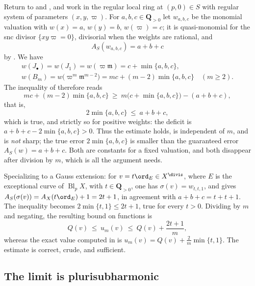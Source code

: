 \begin{example}
\label{ex:ch40-monomial-valuation}
Return to  and
, and work in the regular local ring at
$(p,0)\in S$ with regular system of parameters $(x,y,\varpi)$.  For
$a,b,c\in\mathbf Q_{>0}$ let $w_{a,b,c}$ be the monomial valuation with
$w(x)=a$, $w(y)=b$, $w(\varpi)=c$; it is quasi-monomial for the snc
divisor $\{xy\varpi=0\}$, divisorial when the weights are rational, and
\[
 A_S(w_{a,b,c})=a+b+c
\]
by .  We have
\[
 \begin{gathered}
 w(J_\bullet)=w(J_1)=w(\varpi\mathfrak m)=c+\min\{a,b,c\},\\
 w(B_m)=w\bigl(\varpi^m\mathfrak m^{m-2}\bigr)=mc+(m-2)\min\{a,b,c\}
 \quad(m\ge2).
 \end{gathered}
\]
The inequality of  therefore reads
\[
 mc+(m-2)\min\{a,b,c\}
 \ \ge\ m\bigl(c+\min\{a,b,c\}\bigr)-(a+b+c),
\]
that is,
\[
 2\min\{a,b,c\}\ \le\ a+b+c,
\]
which is true, and strictly so for positive weights: the deficit is
$a+b+c-2\min\{a,b,c\}>0$.  Thus the estimate holds, is independent of
$m$, and is \emph{not} sharp; the true error $2\min\{a,b,c\}$ is smaller
than the guaranteed error $A_S(w)=a+b+c$.  Both are constants for a fixed valuation, and both
disappear after division by $m$, which is all the argument needs.

Specializing to a Gauss extension: for $v=t\ord_E\in X^{\divis}$, where $E$ is the exceptional curve
of $\operatorname{Bl}_pX$, with
$t\in\mathbf Q_{>0}$, one has $\sigma(v)=w_{t,t,1}$, and
 gives
$A_S(\sigma(v))=A_X(t\ord_E)+1=2t+1$, in agreement with
$a+b+c=t+t+1$.  The inequality becomes
$2\min\{t,1\}\le2t+1$, true for every $t>0$.  Dividing by $m$ and
negating, the resulting bound on functions is
\[
 Q(v)\ \le\ u_m(v)\ \le\ Q(v)+\frac{2t+1}{m},
\]
whereas the exact value computed in  is
$u_m(v)=Q(v)+\tfrac2m\min\{t,1\}$.  The estimate is correct, crude, and
sufficient.
\end{example}

\subsection{The limit is plurisubharmonic}
\label{sec:ch40-psh-limit}

